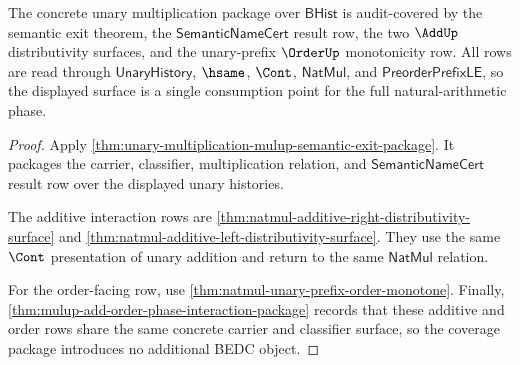 \begin{theorem}
\label{thm:mulup-semantic-exit-audit-row-coverage}
The concrete unary multiplication package over $\mathsf{BHist}$ is
audit-covered by the semantic exit theorem, the
$\mathsf{SemanticNameCert}$ result row, the two $\AddUp$ distributivity
surfaces, and the unary-prefix $\OrderUp$ monotonicity row. All rows are read
through $\mathsf{UnaryHistory}$, $\hsame$, $\Cont$, $\mathsf{NatMul}$, and
$\mathsf{PreorderPrefixLE}$, so the displayed surface is a single consumption
point for the full natural-arithmetic phase.
\end{theorem}
\begin{proof}
Apply \autoref{thm:unary-multiplication-mulup-semantic-exit-package}. It
packages the carrier, classifier, multiplication relation, and
$\mathsf{SemanticNameCert}$ result row over the displayed unary histories.

The additive interaction rows are
\autoref{thm:natmul-additive-right-distributivity-surface} and
\autoref{thm:natmul-additive-left-distributivity-surface}. They use the same
$\Cont$ presentation of unary addition and return to the same
$\mathsf{NatMul}$ relation.

For the order-facing row, use
\autoref{thm:natmul-unary-prefix-order-monotone}. Finally,
\autoref{thm:mulup-add-order-phase-interaction-package} records that these
additive and order rows share the same concrete carrier and classifier
surface, so the coverage package introduces no additional BEDC object.
\end{proof}

